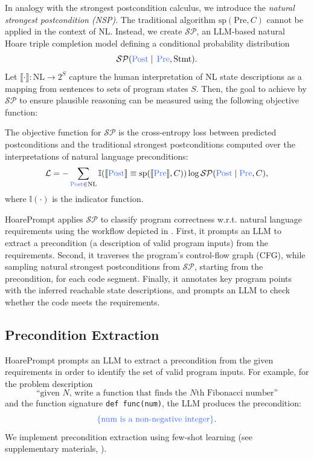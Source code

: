 \documentclass[sigconf]{acmart}
\makeatletter
\newcommand{\projName}{HoarePrompt\xspace}
\def\mathcolor#1#{\@mathcolor{#1}}
\def\@mathcolor#1#2#3{%
  \protect\leavevmode
  \begingroup
    \color#1{#2}#3%
  \endgroup
}
\makeatother
\begin{document}
In analogy with the strongest postcondition calculus, we introduce the \emph{natural strongest postcondition (NSP)}. The traditional algorithm \( \text{sp}(\text{Pre}, C) \) cannot be applied in the context of NL. Instead, we create $\mathcal{SP}$, an LLM-based natural Hoare triple completion model defining a conditional probability distribution $$\mathcal{SP}(\mathcolor{softblue}{\mathrm{Post}} \mid\,\mathcolor{softblue}{\mathrm{Pre}}, \mathrm{Stmt}).$$ Let $\llbracket \cdot \rrbracket: \mathrm{NL} \to 2^S$ capture the human interpretation of NL state descriptions as a mapping from sentences to sets of program states $S$. Then, the goal to achieve by $\mathcal{SP}$ to ensure plausible reasoning can be measured using the following objective function:

\begin{definition} \label{def:objective} The objective function for $\mathcal{SP}$ is the cross-entropy loss between predicted postconditions and the traditional strongest postconditions computed over the interpretations of natural language preconditions: $$\mathcal{L} = -\sum_{\mathcolor{softblue}{\mathrm{Post}} \in \mathrm{NL}} \mathbb{I}(\llbracket \mathcolor{softblue}{\mathrm{Post}} \rrbracket \equiv \mathrm{sp}(\llbracket \mathcolor{softblue}{\mathrm{Pre}} \rrbracket, C)) \log \mathcal{SP}(\mathcolor{softblue}{\mathrm{Post}} \mid \mathcolor{softblue}{\mathrm{Pre}}, C),$$ where \( \mathbb{I}(\cdot) \) is the indicator function.
\end{definition}

\projName applies $\mathcal{SP}$ to classify program correctness w.r.t. natural language requirements using the workflow depicted in . First, it prompts an LLM to extract a precondition (a description of valid program inputs) from the requirements. Second, it traverses the program's control-flow graph (CFG), while sampling natural strongest postconditions from $\mathcal{SP}$, starting from the precondition, for each code segment. Finally, it annotates key program points with the inferred reachable state descriptions, and prompts an LLM to check whether the code meets the requirements.

\subsection{Precondition Extraction}

\projName prompts an LLM to extract a precondition from the given requirements in order to identify the set of valid program inputs. For example, for the problem description
\[
\text{``given $N$, write a function that finds the $N$th Fibonacci number''}
\]
and the function signature \texttt{def func(num)}, the LLM produces the precondition:
\vspace{-4mm}
\[
\mathcolor{softblue}{\{\text{num is a non\mbox{-}negative integer}\}}.
\]
We implement precondition extraction using few-shot learning (see supplementary materials, ).
\end{document}
